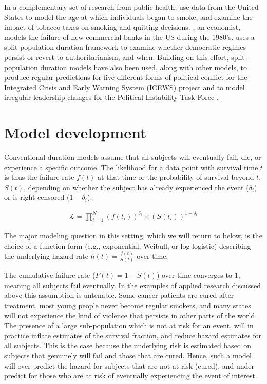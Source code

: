 In a complementary set of research from public health, \citet{douglas1994hazard} use data from the United States to model the age at
which individuals began to smoke, and \citet{forster2001role} examine
the impact of tobacco taxes on smoking and quitting decisions. \citet{deyoung2003failure}, an economist, models the failure of new commercial banks in the
US during the 1980's. \citet{svolik2008authoritarian} uses a split-population duration
framework to examine whether democratic regimes persist or revert to
authoritarianism, and when. Building on this effort, split-population
duration models have also been used, along with other models, to produce
regular predictions for five different forms of political conflict for
the Integrated Crisis and Early Warning System (ICEWS) project \citep{ward2013learning} and to model irregular leadership changes for the Political
Instability Task Force \citep[PITF;][]{beger2014ensemble}.

\section{Model development}

Conventional duration models assume that all subjects will eventually
fail, die, or experience a specific outcome. The likelihood for a data
point with survival time \(t\) is thus the failure rate \(f(t)\) at that
time or the probability of survival beyond \(t\), \(S(t)\), depending on
whether the subject has already experienced the event (\(\delta_i\)) or
is right-censored (\(1-\delta_i\)):

\begin{eqnarray}
\mathcal{L} = \prod_{i=1}^N  \left( f(t_i)\right)^{\delta_i} \times \left( S(t_i) \right)^{1-\delta_i}
\end{eqnarray}

The major modeling question in this setting, which we will return to
below, is the choice of a function form (e.g., exponential, Weibull, or
log-logistic) describing the underlying hazard rate
\(h(t) = \frac{f(t)}{S(t)}\) over time.

The cumulative failure rate (\(F(t) = 1 - S(t)\)) over time converges to
1, meaning all subjects fail eventually. In the examples of applied
research discussed above this assumption is untenable. Some cancer
patients are cured after treatment, most young people never become
regular smokers, and many states will not experience the kind of
violence that persists in other parts of the world. The presence of a
large sub-population which is not at risk for an event, will in practice
inflate estimates of the survival fraction, and reduce hazard estimates
for all subjects. This is the case because the underlying risk is
estimated based on subjects that genuinely will fail and those that are
cured. Hence, such a model will over predict the hazard for subjects
that are not at risk (cured), and under predict for those who are at
risk of eventually experiencing the event of interest.

